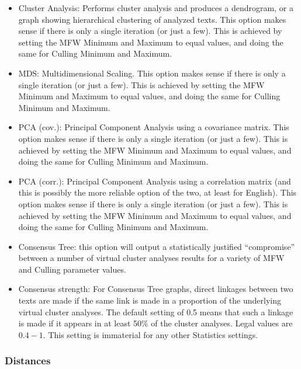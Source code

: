 \documentclass[11pt,a4paper]{article}
\def\margin#1{\marginpar{\textcolor{blue}{\footnotesize\tt #1}}}
\begin{document}
\begin{itemize}
\item Cluster Analysis: Performs cluster analysis and produces a dendrogram,
or a graph showing hierarchical clustering of analyzed texts.
This option makes sense
if there is only a single iteration (or just a few).\margin{"CA"}
This is achieved by setting the MFW Minimum and Maximum to equal values,
and doing the same for Culling Minimum and Maximum. 

\item MDS: Multidimensional Scaling.\margin{"MDS"}
This option makes sense if there is only a single iteration (or just
a few). This is achieved by setting the MFW Minimum and Maximum to
equal values, and doing the same for Culling Minimum and Maximum. 

\item PCA (cov.): Principal Component Analysis using a covariance matrix.\margin{"PCV"}
This option makes sense if there is only a single iteration (or just
a few). This is achieved by setting the MFW Minimum and Maximum to
equal values, and doing the same for Culling Minimum and Maximum. 

\item PCA (corr.): Principal Component Analysis using a correlation matrix
(and this is possibly the more reliable option of the two, at least
for English).\margin{"PCR"} This option
makes sense if there is only a single iteration (or just a few). This
is achieved by setting the MFW Minimum and Maximum to equal values,
and doing the same for Culling Minimum and Maximum. 

\item Consensus Tree: this option will output a statistically justified
``compromise'' between a number of virtual cluster analyses results for 
a variety of MFW and Culling parameter values.\margin{"BCT"} 

\item Consensus strength: For Consensus Tree graphs, direct linkages between
two texts are made if the same link is made in a proportion of the
underlying virtual cluster analyses. The default setting of 0.5 means
that such a linkage is made if it appears in at least 50\% of the
cluster analyses.\margin{consensus.strength=}\margin{<integer>}
Legal values are $0.4-1$. This setting is immaterial for any other
Statistics settings. 
\end{itemize}


\subsubsection{Distances}
\end{document}
